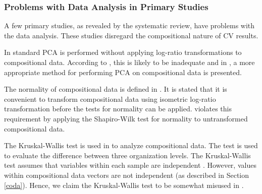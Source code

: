 \subsubsection{\label{codaProblems}Problems with Data Analysis in Primary Studies}

A few primary studies, as revealed by the systematic review, have problems with the data analysis.
These studies disregard the compositional nature of CV results.

In \cite{Pettersson2008,Wohlin2006} standard PCA is performed without applying log-ratio transformations to compositional data. According to \cite{Aitchison1983}, this is likely to be inadequate and in \cite{Filzmoser2007}, a more appropriate method for performing PCA on compositional data is presented.

The normality of compositional data is defined in \cite{PawlowskyGlahn2007}. It is stated that it is convenient to transform compositional data using isometric log-ratio transformation before the tests for normality can be applied. \citep{Jonsson2005a} violates this requirement by applying the Shapiro-Wilk test for normality to untransformed compositional data.

The Kruskal-Wallis test is used in \cite{Jonsson2005a} to analyze compositional data. The test is used to evaluate the difference between three organization levels. The Kruskal-Wallis test assumes that variables within each sample are independent \cite{Kruskal1952a}. However, values within compositional data vectors are not independent (as described in Section \ref{coda}). Hence, we claim the Kruskal-Wallis test to be somewhat misused in \cite{Jonsson2005a}.
